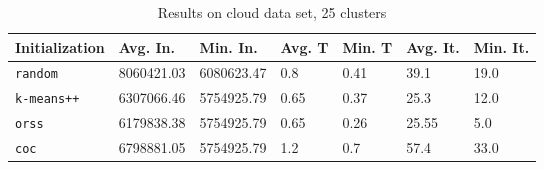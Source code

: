 \begin{table}[h]
	\begin{center}
		\begin{tabular}{|l|l|l|l|l|l|l|}
			\hline
			Initialization & Avg. In. & Min. In. & Avg. T & Min. T & Avg. It. & Min. It.\\\hline
			\texttt{random} & 8060421.03 & 6080623.47 & 0.8 & 0.41 & 39.1 & 19.0\\\hline
			\texttt{k-means++} & 6307066.46 & 5754925.79 & 0.65 & 0.37 & 25.3 & 12.0\\\hline
			\texttt{orss} & 6179838.38 & 5754925.79 & 0.65 & 0.26 & 25.55 & 5.0\\\hline
			\texttt{coc} & 6798881.05 & 5754925.79 & 1.2 & 0.7 & 57.4 & 33.0\\\hline
		\end{tabular}
		\caption{Results on cloud data set, 25 clusters}
		\label{tbl:cloud25}
	\end{center}
\end{table}

